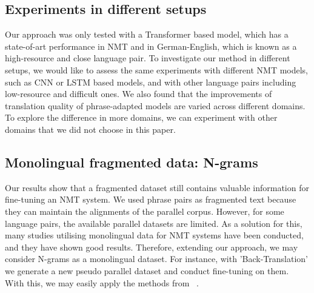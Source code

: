 \subsection{Experiments in different setups}
Our approach was only tested with a Transformer based model, which has a state-of-art performance in NMT and in German-English, which is known as a high-resource and close language pair. To investigate our method in different setups, we would like to assess the same experiments with different NMT models, such as CNN or LSTM based models, and with other language pairs including low-resource and difficult ones. We also found that the improvements of translation quality of phrase-adapted models are varied across different domains. To explore the difference in more domains, we can experiment with other domains that we did not choose in this paper. 

\subsection{Monolingual fragmented data: N-grams}
Our results show that a fragmented dataset still contains valuable information for fine-tuning an NMT system. We used phrase pairs as fragmented text because they can maintain the alignments of the parallel corpus. However, for some language pairs, the available parallel datasets are limited. As a solution for this, many studies utilising monolingual data for NMT systems have been conducted, and they have shown good results. Therefore, extending our approach, we may consider N-grams as a monolingual dataset. For instance, with 'Back-Translation'\parencite{sennrich-etal-2016-improving} we generate a new pseudo parallel dataset and conduct fine-tuning on them. With this, we may easily apply the methods from ~\cite{galle2015reconstructing}. 




